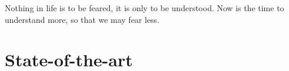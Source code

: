 



\begin{savequote}[50mm]
	Nothing in life is to be feared, it is only to be understood. Now is the time to understand more, so that we may fear less.
\end{savequote}


\chapter{State-of-the-art}
\label{cha:3_State-of-the-art}


